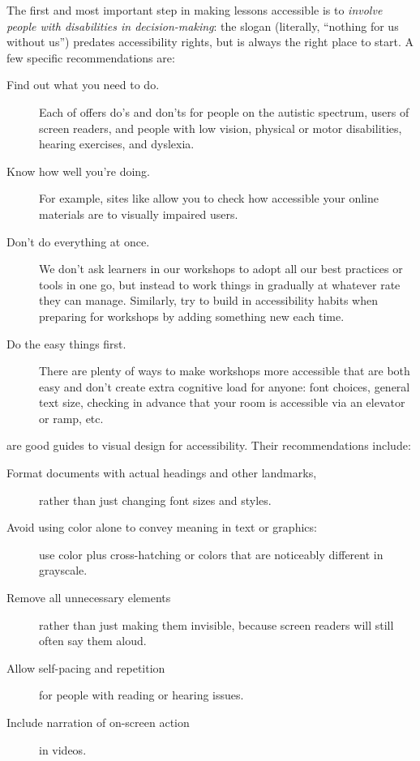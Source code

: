 The first and most important step in making lessons accessible is to
\emph{involve people with disabilities in decision-making}: the slogan
\emph{} (literally, ``nothing
for us without us'') predates accessibility rights, but is always the
right place to start. A few specific recommendations are:

\begin{description}
\item[Find out what you need to do.]
Each of  offers do's and
don'ts for people on the autistic spectrum, users of screen readers,
and people with low vision, physical or motor disabilities, hearing
exercises, and dyslexia.
\item[Know how well you're doing.]
For example, sites like  allow you to check how
accessible your online materials are to visually impaired users.
\item[Don't do everything at once.]
We don't ask learners in our workshops to adopt all our best
practices or tools in one go, but instead to work things in
gradually at whatever rate they can manage. Similarly, try to build
in accessibility habits when preparing for workshops by adding
something new each time.
\item[Do the easy things first.]
There are plenty of ways to make workshops more accessible that are
both easy and don't create extra cognitive load for anyone: font
choices, general text size, checking in advance that your room is
accessible via an elevator or ramp, etc.
\end{description}

\cite{Coom2012,Burg2015} are good guides to visual design for
accessibility. Their recommendations include:

\begin{description}
\item[Format documents with actual headings and other landmarks,]
rather than just changing font sizes and styles.
\item[Avoid using color alone to convey meaning in text or graphics:]
use color plus cross-hatching or colors that are noticeably
different in grayscale.
\item[Remove all unnecessary elements]
rather than just making them invisible, because screen readers will
still often say them aloud.
\item[Allow self-pacing and repetition]
for people with reading or hearing issues.
\item[Include narration of on-screen action]
in videos.
\end{description}

